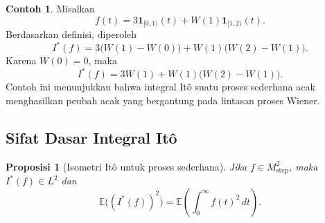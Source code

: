 \documentclass[12pt,a4paper]{article}
\theoremstyle{definition}
\newtheorem{contoh}[definisi]{Contoh}
\theoremstyle{plain}
\newtheorem{proposisi}[definisi]{Proposisi}
\newcommand{\E}{\mathbb{E}}
\newcommand{\ind}{\mathbf{1}}
\begin{document}
\begin{contoh}
  Misalkan
  \[
    f(t)=3\ind_{[0,1)}(t)+W(1)\ind_{[1,2)}(t).
  \]
  Berdasarkan definisi, diperoleh
  \[
    I^\ast(f)
    =
    3\bigl(W(1)-W(0)\bigr)+W(1)\bigl(W(2)-W(1)\bigr).
  \]
  Karena $W(0)=0$, maka
  \[
    I^\ast(f)=3W(1)+W(1)\bigl(W(2)-W(1)\bigr).
  \]
  Contoh ini menunjukkan bahwa integral It\^o suatu proses sederhana acak
  menghasilkan peubah acak yang bergantung pada lintasan proses Wiener.
\end{contoh}

\subsection{Sifat Dasar Integral It\^o}

\begin{proposisi}[Isometri It\^o untuk proses sederhana]
  Jika $f\in M_{\mathrm{step}}^2$, maka $I^\ast(f)\in L^2$ dan
  \[
    \E\bigl((I^\ast(f))^2\bigr)
    =
    \E\left(\int_0^\infty f(t)^2\,dt\right).
  \]
\end{proposisi}
\end{document}
